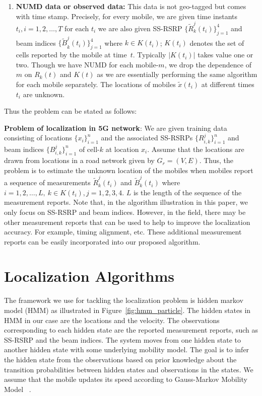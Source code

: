 \documentclass[conference, 10pt]{IEEEtran}
\newcommand{\abs}[1]{\lvert #1 \rvert}
\newcommand{\card}[1]{\abs{#1}}
\begin{document}
\begin{NoHyper}
\begin{enumerate}
\item \textbf{NUMD data or observed data:} This data is not geo-tagged but comes
with time stamp. Precisely, for every mobile, we are given time instants
$t_i, i=1,2,\hdots,T$ for each $t_i$ we are also given SS-RSRP
$\{{\tilde{R}}^j_k(t_i)\}_{j=1}^4$ and beam indices ${\{\tilde{B}}^j_k(t_i)\}_{j=1}^4$ where $k\in K(t_i)$; $K(t_i)$ denotes the set of cells reported by
the mobile at time~$t$. Typically $\card{K(t_i)}$ takes value one or two.
Though we have NUMD for each mobile-$m$, we drop the dependence of $m$
on $R_k(t)$ and $K(t)$ as we are essentially performing the same algorithm
for each mobile separately. The locations of mobiles $\tilde{x}(t_i)$ at different
times $t_i$ are unknown.
	
\end{enumerate} 

Thus the problem can be stated as follows:

{\bf Problem of localization in 5G network}: 
We are given training data consisting
of locations $\{x_i\}_{i=1}^n$ and the associated SS-RSRPs  $\{R^j_{i,k}\}_{i=1}^n$ and beam indices $\{B^j_{i,k}\}_{i=1}^n$ of
cell-$k$ at location $x_i$. Assume that the locations
are drawn from locations in a road network given by $G_r=(V,E)$. Thus, the problem is to estimate the unknown location of the mobiles when mobiles report a sequence of measurements
${\tilde{R}}^j_k(t_i)$ and ${\tilde{B}}^j_k(t_i)$ where $i=1,2,\hdots,L,\ k\in K(t_i), j=1, 2, 3, 4$. $L$ is the length of the sequence of the measurement reports.
Note that, in the algorithm illustration in this paper, we only focus on SS-RSRP and beam indices. However, in the field, there may be other measurement reports that 
can be used to help to improve the localization accuracy. For example, timing alignment, etc. These additional measurement reports can be easily incorporated into our proposed algorithm.

\section{Localization Algorithms}
\label{sec:localalgo}

The framework we use for tackling the localization problem is hidden markov model (HMM) as illustrated 
in Figure~\ref{fig:hmm_particle}. The hidden states in HMM in our case are the locations and the velocity. 
The observations corresponding to each hidden state are the reported measurement reports, such as SS-RSRP and the beam indices.
The system moves from one hidden state to another hidden state with some underlying mobility model. 
The goal is to infer the hidden state from the observations based on
prior knowledge about the transition probabilities between hidden states and
observations in the states. We assume that the mobile updates its speed according to Gauss-Markov Mobility Model ~\cite{Camp2002}.


\end{NoHyper}
\end{document}
